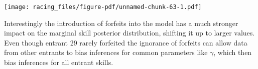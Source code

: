 \documentclass[
  letterpaper,
  DIV=11,
  numbers=noendperiod]{scrartcl}
\newenvironment{Shaded}{\begin{snugshade}}{\end{snugshade}}
\newcommand{\AttributeTok}[1]{\textcolor[rgb]{0.40,0.45,0.13}{#1}}
\newcommand{\ConstantTok}[1]{\textcolor[rgb]{0.56,0.35,0.01}{#1}}
\newcommand{\DecValTok}[1]{\textcolor[rgb]{0.68,0.00,0.00}{#1}}
\newcommand{\FloatTok}[1]{\textcolor[rgb]{0.68,0.00,0.00}{#1}}
\newcommand{\FunctionTok}[1]{\textcolor[rgb]{0.28,0.35,0.67}{#1}}
\newcommand{\NormalTok}[1]{\textcolor[rgb]{0.00,0.23,0.31}{#1}}
\newcommand{\SpecialCharTok}[1]{\textcolor[rgb]{0.37,0.37,0.37}{#1}}
\newcommand{\StringTok}[1]{\textcolor[rgb]{0.13,0.47,0.30}{#1}}
\begin{document}
\begin{Shaded}
\end{Shaded}

\texttt{[image: racing\_files/figure-pdf/unnamed-chunk-63-1.pdf]}

Interestingly the introduction of forfeits into the model has a much
stronger impact on the marginal skill posterior distribution, shifting
it up to larger values. Even though entrant 29 rarely forfeited the
ignorance of forfeits can allow data from other entrants to bias
inferences for common parameters like \(\gamma\), which then bias
inferences for all entrant skills.
\end{document}
